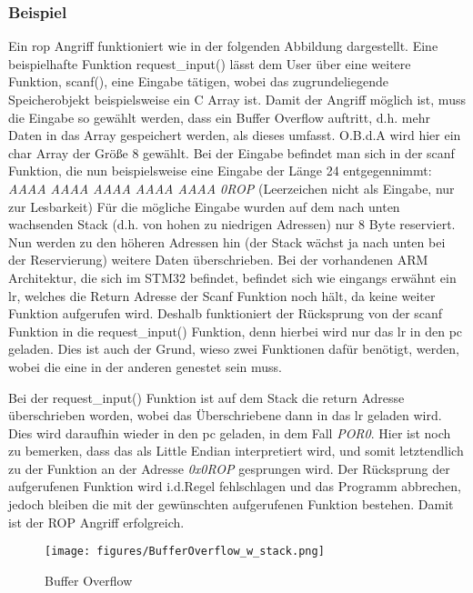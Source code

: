 \documentclass[a4paper,
DIV=13,
12pt,
BCOR=10mm,
department=FakIM,
oneside,
parskip=half,
automark,
listof=totocnumbered,
bibliography=totocnumbered,
acronym=totocnumbered
] {OTHRartcl}
\begin{document}

\subsubsection{Beispiel}
Ein \ac{rop} Angriff funktioniert wie in der folgenden Abbildung dargestellt.
Eine beispielhafte Funktion request\_input() lässt dem User über eine weitere Funktion, scanf(), eine Eingabe tätigen, wobei das zugrundeliegende Speicherobjekt beispielsweise ein C Array ist.
Damit der Angriff möglich ist, muss die Eingabe so gewählt werden, dass ein Buffer Overflow auftritt, d.h. mehr Daten in das Array gespeichert werden, als dieses umfasst.
O.B.d.A wird hier ein char Array der Größe 8 gewählt. Bei der Eingabe befindet man sich in der scanf Funktion, die nun beispielsweise eine Eingabe der Länge 24 entgegennimmt:
\textit{AAAA AAAA AAAA AAAA AAAA 0ROP}  (Leerzeichen nicht als Eingabe, nur zur Lesbarkeit)
Für die mögliche Eingabe wurden auf dem nach unten wachsenden Stack (d.h. von hohen zu niedrigen Adressen) nur 8 Byte reserviert.
Nun werden zu den höheren Adressen hin (der Stack wächst ja nach unten bei der Reservierung) weitere Daten überschrieben.
Bei der vorhandenen ARM Architektur, die sich im STM32 befindet, befindet sich wie eingangs erwähnt ein \ac{lr}, welches die Return Adresse der Scanf Funktion noch hält, da keine weiter Funktion aufgerufen wird.
Deshalb funktioniert der Rücksprung von der scanf Funktion in die request\_input() Funktion, denn hierbei wird nur das \ac{lr} in den \ac{pc} geladen.
Dies ist auch der Grund, wieso zwei Funktionen dafür benötigt, werden, wobei die eine in der anderen genestet sein muss.

Bei der request\_input() Funktion ist auf dem Stack die return Adresse überschrieben worden, wobei das Überschriebene dann in das \ac{lr} geladen wird.
Dies wird daraufhin wieder in den \ac{pc} geladen, in dem Fall \textit{POR0}. Hier ist noch zu bemerken, dass das als Little Endian interpretiert wird, und somit
letztendlich zu der Funktion an der Adresse \textit{0x0ROP} gesprungen wird.
Der Rücksprung der aufgerufenen Funktion wird i.d.Regel fehlschlagen und das Programm abbrechen, jedoch bleiben die mit der gewünschten aufgerufenen Funktion bestehen.
Damit ist der ROP Angriff erfolgreich.
\begin{figure}[ht!]
  \begin{center}
    \texttt{[image: figures/BufferOverflow\_w\_stack.png]}
    \caption{Buffer Overflow}
    \label{fig: Buffer Overflow}
  \end{center}
\end{figure}
\end{document}
